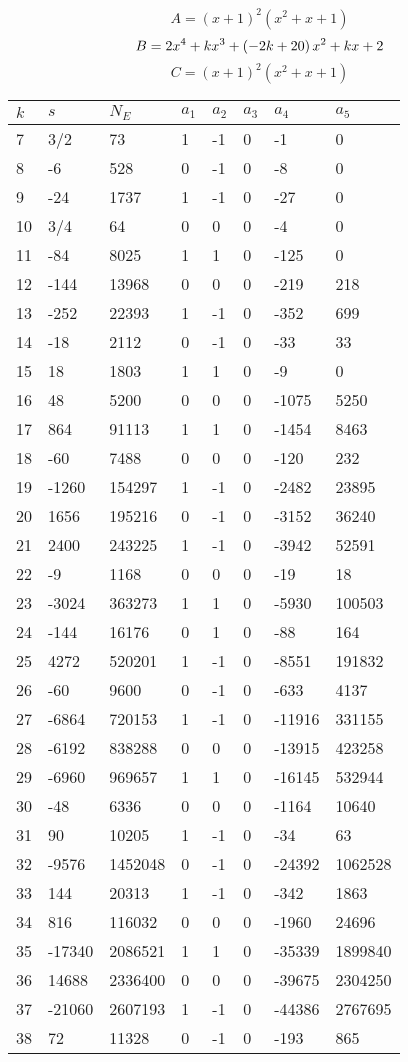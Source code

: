 \documentclass{amsart}
\begin{document}
$$A=(x
 + 1)^{2}(x^2
 + x
 + 1)$$
$$B=2\*x^4
 + k\*x^3
 + \left(-2\*k
 + 20\right) \*x^2
 + k\*x
 + 2$$
$$C=(x
 + 1)^{2}(x^2
 + x
 + 1)$$
\begin{longtable}{|l|l|l|lllll|}
\hline
$k$ & $s$ & $N_E$ & $a_1$ & $a_2$ & $a_3$ & $a_4$ & $a_5$\\
\hline
7&3/2&73&1&-1&0&-1&0\\
8&-6&528&0&-1&0&-8&0\\
9&-24&1737&1&-1&0&-27&0\\
10&3/4&64&0&0&0&-4&0\\
11&-84&8025&1&1&0&-125&0\\
12&-144&13968&0&0&0&-219&218\\
13&-252&22393&1&-1&0&-352&699\\
14&-18&2112&0&-1&0&-33&33\\
15&18&1803&1&1&0&-9&0\\
16&48&5200&0&0&0&-1075&5250\\
17&864&91113&1&1&0&-1454&8463\\
18&-60&7488&0&0&0&-120&232\\
19&-1260&154297&1&-1&0&-2482&23895\\
20&1656&195216&0&-1&0&-3152&36240\\
21&2400&243225&1&-1&0&-3942&52591\\
22&-9&1168&0&0&0&-19&18\\
23&-3024&363273&1&1&0&-5930&100503\\
24&-144&16176&0&1&0&-88&164\\
25&4272&520201&1&-1&0&-8551&191832\\
26&-60&9600&0&-1&0&-633&4137\\
27&-6864&720153&1&-1&0&-11916&331155\\
28&-6192&838288&0&0&0&-13915&423258\\
29&-6960&969657&1&1&0&-16145&532944\\
30&-48&6336&0&0&0&-1164&10640\\
31&90&10205&1&-1&0&-34&63\\
32&-9576&1452048&0&-1&0&-24392&1062528\\
33&144&20313&1&-1&0&-342&1863\\
34&816&116032&0&0&0&-1960&24696\\
35&-17340&2086521&1&1&0&-35339&1899840\\
36&14688&2336400&0&0&0&-39675&2304250\\
37&-21060&2607193&1&-1&0&-44386&2767695\\
38&72&11328&0&-1&0&-193&865\\

\end{longtable}
\end{document}
